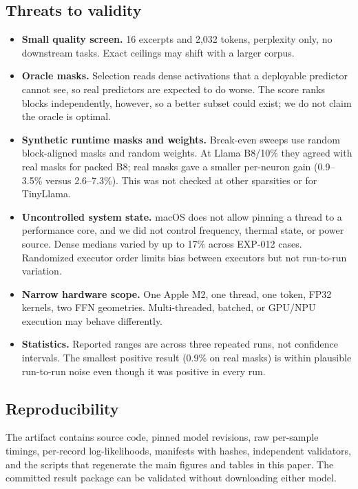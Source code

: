 \subsection{Threats to validity}

\begin{itemize}
\setlength\itemsep{1pt}
\item \textbf{Small quality screen.} 16 excerpts and 2,032 tokens, perplexity
  only, no downstream tasks. Exact ceilings may shift with a larger corpus.
\item \textbf{Oracle masks.} Selection reads dense activations that a
  deployable predictor cannot see, so real predictors are expected to do
  worse. The score ranks blocks independently, however, so a better subset
  could exist; we do not claim the oracle is optimal.
\item \textbf{Synthetic runtime masks and weights.} Break-even sweeps use random
  block-aligned masks and random weights. At Llama B8/10\% they agreed with
  real masks for packed B8; real masks gave a smaller per-neuron gain
  (0.9--3.5\% versus 2.6--7.3\%). This was not checked at other sparsities or
  for TinyLlama.
\item \textbf{Uncontrolled system state.} macOS does not allow pinning a thread
  to a performance core, and we did not control frequency, thermal state, or
  power source. Dense medians varied by up to 17\% across EXP-012 cases.
  Randomized executor order limits bias between executors but not
  run-to-run variation.
\item \textbf{Narrow hardware scope.} One Apple M2, one thread, one token, FP32
  kernels, two FFN geometries. Multi-threaded, batched, or GPU/NPU execution
  may behave differently.
\item \textbf{Statistics.} Reported ranges are across three repeated runs, not
  confidence intervals. The smallest positive result (0.9\% on real masks) is
  within plausible run-to-run noise even though it was positive in every run.
\end{itemize}

\subsection{Reproducibility}

The artifact contains source code, pinned model revisions, raw per-sample
timings, per-record log-likelihoods, manifests with hashes, independent
validators, and the scripts that regenerate the main figures and tables in
this paper. The committed result package can be validated without downloading
either model.
